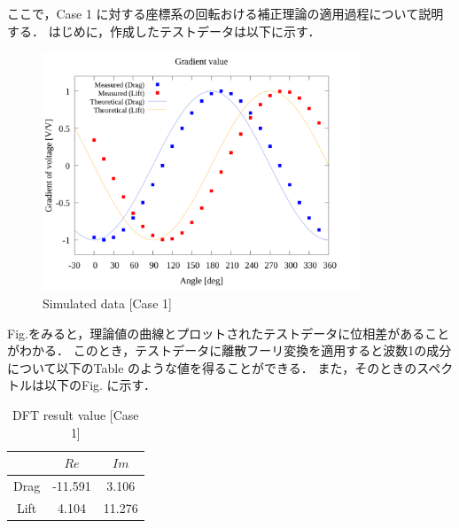 ここで，Case 1 に対する座標系の回転おける補正理論の適用過程について説明する．
はじめに，作成したテストデータは以下に示す．

\begin{figure}[htbp]
    \footnotesize
    \begin{center}
        \includegraphics[width=95mm]{../../02_workspace/result/rotation_tx=15.0_tx=20.0/plot/20/20_adjust-value.png}
        \caption{Simulated data [Case 1]}
    \end{center}
\end{figure}

Fig.をみると，理論値の曲線とプロットされたテストデータに位相差があることがわかる．
このとき，テストデータに離散フーリ変換を適用すると波数1の成分について以下のTable のような値を得ることができる．
また，そのときのスペクトルは以下のFig. に示す．

\begin{table}[htbp]
    \begin{center}
        \caption{DFT result value [Case 1]}
        \begin{tabular}{|p{30mm}|p{20mm}|p{20mm}|}
            \hline
            \multicolumn{1}{|c|}{}       & \multicolumn{1}{|c|}{$Re$}   & \multicolumn{1}{|c|}{$Im$} \\ \hline
            \multicolumn{1}{|c|}{Drag} & \multicolumn{1}{|c|}{-11.591} & \multicolumn{1}{|c|}{3.106}         \\ \hline
            \multicolumn{1}{|c|}{Lift} & \multicolumn{1}{|c|}{4.104}     & \multicolumn{1}{|c|}{11.276}         \\ \hline
        \end{tabular}
    \end{center}
\end{table}

